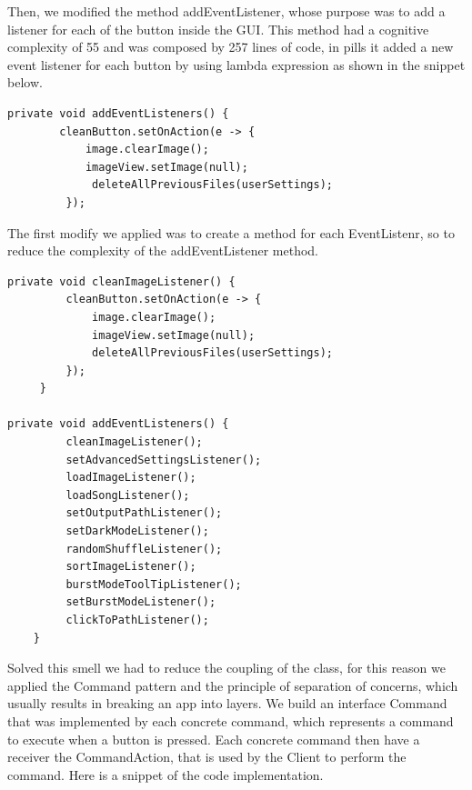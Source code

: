 \documentclass{article}
\begin{document}
Then, we modified the method addEventListener, whose  purpose was to add a listener for each of the button inside the GUI. This method had a cognitive complexity of 55 and was composed by 257 lines of code, in pills it added a new event listener for each button by using lambda expression as shown in the snippet below.

\begin{lstlisting}[caption={Old Implementation},captionpos =b]
private void addEventListeners() {
        cleanButton.setOnAction(e -> {
            image.clearImage();
            imageView.setImage(null);
             deleteAllPreviousFiles(userSettings);
         });
\end{lstlisting}

The first modify we applied was to create a method for each EventListenr, so to reduce the complexity of the addEventListener method.

\begin{lstlisting}[caption={First modifies},captionpos =b]
private void cleanImageListener() {
         cleanButton.setOnAction(e -> {
             image.clearImage();
             imageView.setImage(null);
             deleteAllPreviousFiles(userSettings);
         });
     }
     
private void addEventListeners() {
         cleanImageListener();
         setAdvancedSettingsListener();
         loadImageListener();
         loadSongListener();
         setOutputPathListener();
         setDarkModeListener();
         randomShuffleListener();
         sortImageListener();
         burstModeToolTipListener();
         setBurstModeListener();
         clickToPathListener();
    }
\end{lstlisting}
Solved this smell we had to reduce the coupling of the class, for this reason we applied the Command pattern and the principle of separation of concerns, which usually results in breaking an app into layers.
We build an interface Command that was implemented by each concrete command, which represents a command to execute when a button is pressed.
Each concrete command then have a receiver the CommandAction, that is used by the Client to perform the command.
Here is a snippet of the code implementation.

\end{document}
